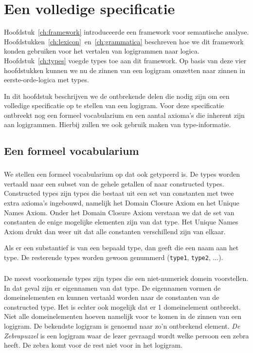\chapter{Een volledige specificatie}
\label{ch:specificatie}

Hoofdstuk~\ref{ch:framework} introduceerde een framework voor semantische analyse. Hoofdstukken~\ref{ch:lexicon}~en~\ref{ch:grammatica} beschreven hoe we dit framework konden gebruiken voor het vertalen van logigrammen naar logica. Hoofdstuk~\ref{ch:types} voegde types toe aan dit framework. Op basis van deze vier hoofdstukken kunnen we nu de zinnen van een logigram omzetten naar zinnen in eerste-orde-logica met types.

In dit hoofdstuk beschrijven we de ontbrekende delen die nodig zijn om een volledige specificatie op te stellen van een logigram. Voor deze specificatie ontbreekt nog een formeel vocabularium en een aantal axioma's die inherent zijn aan logigrammen. Hierbij zullen we ook gebruik maken van type-informatie.

\section{Een formeel vocabularium}
\label{sec:vocabularium}
\paragraph{} We stellen een formeel vocabularium op dat ook getypeerd is. De types worden vertaald naar een subset van de gehele getallen of naar constructed types. Constructed types zijn types die bestaat uit een set van constanten met twee extra axioma's ingebouwd, namelijk het Domain Closure Axiom en het Unique Names Axiom. Onder het Domain Closure Axiom verstaan we dat de set van constanten de enige mogelijke elementen zijn van dat type. Het Unique Names Axiom drukt dan weer uit dat alle constanten verschillend zijn van elkaar.

Als er een substantief is van een bepaald type, dan geeft die een naam aan het type. De resterende types worden gewoon genummerd (\texttt{type1}, \texttt{type2}, ...).

\paragraph{} De meest voorkomende types zijn types die een niet-numeriek domein voorstellen. In dat geval zijn er eigennamen van dat type. De eigennamen vormen de domeinelementen en kunnen vertaald worden naar de constanten van de constructed type. Het is echter ook mogelijk dat er 1 domeinelement ontbreekt. Niet alle domeinelementen hoeven namelijk voor te komen in de zinnen van een logigram. De bekendste logigram is genoemd naar zo'n ontbrekend element. \textit{De Zebrapuzzel} \cite{zebra} is een logigram waar de lezer gevraagd wordt welke persoon een zebra heeft. De zebra komt voor de rest niet voor in het logigram.

